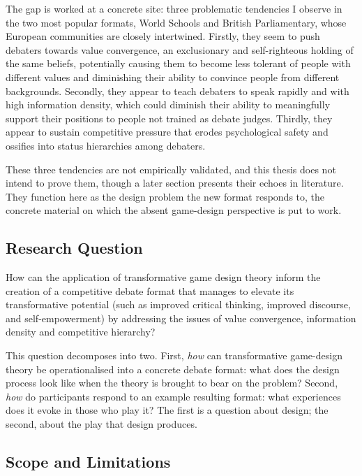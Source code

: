 The gap is worked at a concrete site: three problematic tendencies I observe in the two most popular formats, World Schools and British Parliamentary, whose European communities are closely intertwined. Firstly, they seem to push debaters towards value convergence, an exclusionary and self-righteous holding of the same beliefs, potentially causing them to become less tolerant of people with different values and diminishing their ability to convince people from different backgrounds. Secondly, they appear to teach debaters to speak rapidly and with high information density, which could diminish their ability to meaningfully support their positions to people not trained as debate judges. Thirdly, they appear to sustain competitive pressure that erodes psychological safety and ossifies into status hierarchies among debaters.

These three tendencies are not empirically validated, and this thesis does not intend to prove them, though a later section presents their echoes in literature. They function here as the design problem the new format responds to, the concrete material on which the absent game-design perspective is put to work.

\subsection{Research Question}

How can the application of transformative game design theory inform the creation of a competitive debate format that manages to elevate its transformative potential (such as improved critical thinking, improved discourse, and self-empowerment) by addressing the issues of value convergence, information density and competitive hierarchy?

This question decomposes into two. First, \emph{how} can transformative game-design theory be operationalised into a concrete debate format: what does the design process look like when the theory is brought to bear on the problem? Second, \emph{how} do participants respond to an example resulting format: what experiences does it evoke in those who play it? The first is a question about design; the second, about the play that design produces.

\subsection{Scope and Limitations}

